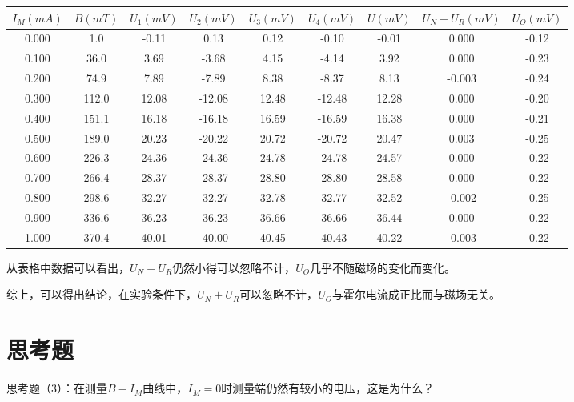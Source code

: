 \documentclass{article}
\begin{document}
    \begin{center}
        \begin{tabular}{|c||c||c|c|c|c||c|c|c|}
            \hline
            $I_M(mA)$ & $B(mT)$ &$U_1(mV)$ & $U_2(mV)$ & $U_3(mV)$ & $U_4(mV)$ & $U(mV)$ & $U_N+U_R(mV)$ & $U_O(mV)$\\
            \hline
            0.000 & 1.0 & -0.11 & 0.13 & 0.12 & -0.10 & -0.01  & 0.000 & -0.12\\
            \hline
            0.100 & 36.0 & 3.69 & -3.68 & 4.15 & -4.14 & 3.92 & 0.000 & -0.23 \\
            \hline
            0.200 & 74.9 & 7.89 & -7.89 & 8.38 & -8.37 & 8.13 & -0.003 & -0.24 \\
            \hline
            0.300 & 112.0 & 12.08 & -12.08 & 12.48 & -12.48 & 12.28 & 0.000 & -0.20 \\
            \hline
            0.400 & 151.1 & 16.18 & -16.18 & 16.59 & -16.59 & 16.38 & 0.000 & -0.21 \\
            \hline
            0.500 & 189.0 & 20.23 & -20.22 & 20.72 & -20.72 & 20.47 & 0.003 & -0.25 \\
            \hline
            0.600 & 226.3 & 24.36 & -24.36 & 24.78 & -24.78 & 24.57 & 0.000 & -0.22 \\
            \hline
            0.700 & 266.4 & 28.37 & -28.37 & 28.80 & -28.80 & 28.58  & 0.000 &-0.22\\
            \hline
            0.800 & 298.6 & 32.27 & -32.27 & 32.78 & -32.77 & 32.52 & -0.002 & -0.25 \\
            \hline
            0.900 & 336.6 & 36.23 & -36.23 & 36.66 & -36.66 & 36.44  & 0.000 & -0.22\\
            \hline
            1.000 & 370.4 & 40.01 & -40.00 & 40.45 & -40.43 & 40.22  & -0.003 & -0.22\\
            \hline
        \end{tabular}        
    \end{center}

    从表格中数据可以看出，$U_N+U_R$仍然小得可以忽略不计，$U_O$几乎不随磁场的变化而变化。

    综上，可以得出结论，在实验条件下，$U_N+U_R$可以忽略不计，$U_O$与霍尔电流成正比而与磁场无关。

    \section{思考题}
    思考题（3）：在测量$B-I_M$曲线中，$I_M=0$时测量端仍然有较小的电压，这是为什么？
\end{document}
